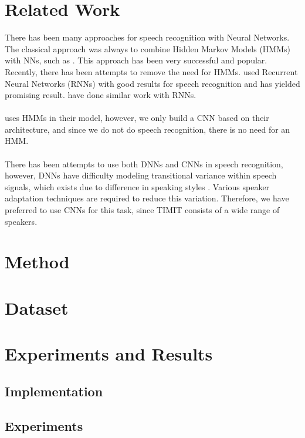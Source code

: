 \documentclass[a4paper,12pt]{article}
\begin{document}
\section{Related Work}
There has been many approaches for speech recognition with Neural Networks. The classical approach was always to combine Hidden Markov Models (HMMs) with NNs, such as \cite{robinson1994application}. This approach has been very successful and popular. Recently, there has been attempts to remove the need for HMMs. \cite{graves2013speech} used Recurrent Neural Networks (RNNs) with good results for speech recognition and has yielded promising result. \cite{graves2014towards} have done similar work with RNNs.\\\\
\cite{sainath2013deep} uses HMMs in their model, however, we only build a CNN based on their architecture, and since we do not do speech recognition, there is no need for an HMM.\\\\
There has been attempts to use both DNNs and CNNs in speech recognition, however, DNNs have difficulty modeling transitional variance within speech signals, which exists due to difference in speaking styles \cite{lecun1995convolutional}. Various speaker adaptation techniques are required to reduce this variation. Therefore, we have preferred to use CNNs for this task, since TIMIT consists of a wide range of speakers.

\section{Method}


\section{Dataset}\label{sec:spect}


\section{Experiments and Results}
\subsection{Implementation}
\label{sec:impl}

\subsection{Experiments}
\label{sec:experiments}

\end{document}
